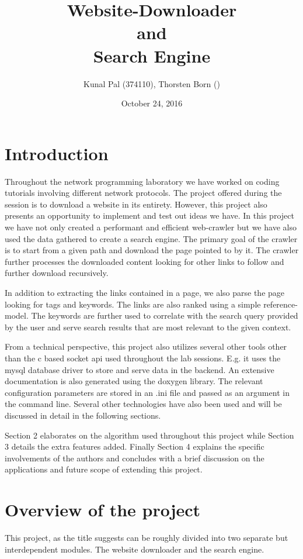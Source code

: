 \documentclass{project_report}
\title{Website-Downloader \\and \\Search Engine}
\author{Kunal Pal (374110), Thorsten Born ()}
\date{October 24, 2016}
\begin{document}
\maketitle

\section{Introduction} 

Throughout the network programming laboratory we have worked on coding tutorials involving different network protocols. The project offered during the session is to download a website in its entirety. However, this project also presents an opportunity to implement and test out ideas we have. In this project we have not only created a performant and efficient web-crawler but we have also used the data gathered to create a search engine. The primary goal of the crawler is to start from a given path and download the page pointed to by it. The crawler further processes the downloaded content looking for other links to follow and further download recursively.

In addition to extracting the links contained in a page, we also parse the page looking for tags and keywords. The links are also ranked using a simple reference-model. The keywords are further used to correlate with the search query provided by the user and serve search results that are most relevant to the given context.

From a technical perspective, this project also utilizes several other tools other than the c based socket api used throughout the lab sessions. E.g. it uses the mysql database driver to store and serve data in the backend. An extensive documentation is also generated using the doxygen library. The relevant configuration parameters are stored in an .ini file and passed as an argument in the command line. Several other technologies have also been used and will be discussed in detail in the following sections.

Section 2 elaborates on the algorithm used throughout this project while Section 3 details the extra features added. Finally Section 4 explains the specific involvements of the authors and concludes with a brief discussion on the applications and future scope of extending this project.

\section{Overview of the project}
This project, as the title suggests can be roughly divided into two separate but interdependent modules. The website downloader and the search engine. 
\end{document}
